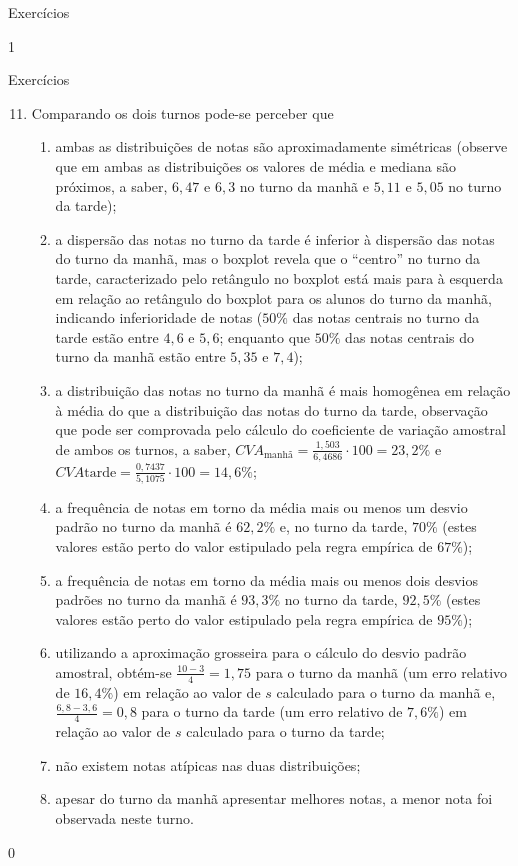 {{{\begin{answer}{Exercícios}
{\begin{figure}[H]
  \end{figure}
}{1}
\end{answer}
\begin{answer}{Exercícios}
{\exerciselist
  \begin{enumerate}\setcounter{enumi}{10}
  \item  Comparando os dois turnos pode-se perceber que
  \begin{enumerate}
  \item ambas as distribuições de notas são aproximadamente simétricas (observe que em ambas as distribuições os valores de média e mediana são próximos, a saber, $6{,}47$ e $6{,}3$ no turno da manhã e $5{,}11$ e $5{,}05$ no turno da tarde);
  \item a dispersão das notas no turno da tarde é inferior à dispersão das notas do turno da manhã, mas o boxplot revela que o “centro”{} no turno da tarde, caracterizado pelo retângulo no boxplot está mais para à esquerda em relação ao retângulo do boxplot para os alunos do turno da manhã, indicando inferioridade de notas ($50\%$ das notas centrais no turno da tarde estão entre $4{,}6$ e $5{,}6$; enquanto que $50\%$ das notas centrais do turno da manhã estão entre $5{,}35$ e $7{,}4$);
  \item a distribuição das notas no turno da manhã é mais homogênea em relação à média do que a distribuição das notas do turno da tarde, observação que pode ser comprovada pelo cálculo do coeficiente de variação amostral de ambos os turnos, a saber, $CVA_{\text{manhã}}=\frac{1{,}503}{6{,}4686}\cdot100=23{,}2\%$ e $CVA{\text{tarde}}=\frac{0{,}7437}{5{,}1075}\cdot100=14{,}6\%$;
  \item a frequência de notas em torno da média mais ou menos um desvio padrão no turno da manhã é $62{,}2\%$ e, no turno da tarde, $70\%$ (estes valores estão perto do valor estipulado pela regra empírica de $67\%$);
  \item a frequência de notas em torno da média mais ou menos dois desvios padrões no turno da manhã é $93{,}3\%$ no turno da tarde, $92{,}5\%$ (estes valores estão perto do valor estipulado pela regra empírica de $95\%$);
  \item utilizando a aproximação grosseira para o cálculo do desvio padrão amostral, obtém-se $\frac{10-3}{4}=1{,}75$ para o turno da manhã (um erro relativo de $16{,}4\%$) em relação ao valor de $s$ calculado para o turno da manhã e, $\frac{6{,}8-3{,}6}{4}=0{,}8$ para o turno da tarde (um erro relativo de $7{,}6\%$) em relação ao valor de $s$ calculado para o turno da tarde;
  \item não existem notas atípicas nas duas distribuições;
  \item apesar do turno da manhã apresentar melhores notas, a menor nota foi observada neste turno.
  \end{enumerate}
  \end{enumerate}
}{0}
\end{answer}
\clearmargin

}}}
